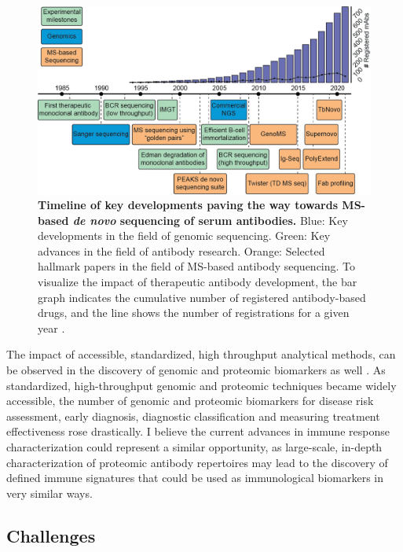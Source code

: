 \begin{figure}[!htb]
  \center
  \includegraphics[]{Chapter.1/Figures/f7.png}
  \caption{\textbf{Timeline of key developments paving the way towards MS-based \emph{de novo} sequencing of serum antibodies.} Blue: Key developments in the field of genomic sequencing. Green: Key advances in the field of antibody research. Orange: Selected hallmark papers in the field of MS-based antibody sequencing. To visualize the impact of therapeutic antibody development, the bar graph indicates the cumulative number of registered antibody-based drugs, and the line shows the number of registrations for a given year \cite{raybould2020thera-sabdab:}.}
  \label{fig:fig6.1}
\end{figure}
The impact of accessible, standardized, high throughput analytical methods, can be observed in the discovery of genomic and proteomic biomarkers as well \cite{simon2011genomic, cui2022high-throughput}. As standardized, high-throughput genomic and proteomic techniques became widely accessible, the number of genomic and proteomic biomarkers for disease risk assessment, early diagnosis, diagnostic classification and measuring treatment effectiveness rose drastically. I believe the current advances in immune response characterization could represent a similar opportunity, as large-scale, in-depth characterization of proteomic antibody repertoires may lead to the discovery of defined immune signatures that could be used as immunological biomarkers in very similar ways.

\subsection{Challenges}

